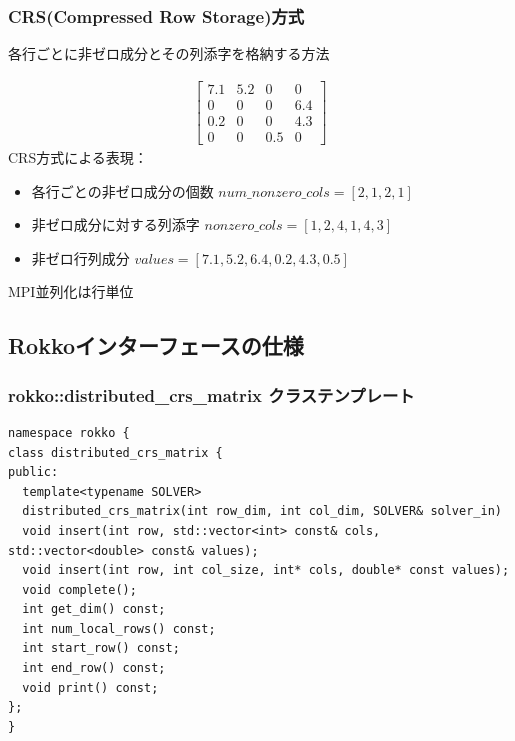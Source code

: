 \begin{frame}[c,fragile]
  \frametitle{CRS(Compressed Row Storage)方式}
各行ごとに非ゼロ成分とその列添字を格納する方法

\begin{rei}%
\vspace{-2\baselineskip}
\begin{align*}
\begin{bmatrix}
7.1 & 5.2 & 0 & 0 \\
0 & 0 & 0 & 6.4 \\
0.2 & 0 & 0 & 4.3 \\
0 & 0 & 0.5 & 0
\end{bmatrix}
\end{align*}
CRS方式による表現：
\begin{itemize}
\item 各行ごとの非ゼロ成分の個数 $num\_nonzero\_cols = [2, 1, 2, 1]$
\item 非ゼロ成分に対する列添字 $nonzero\_cols = [1, 2, 4, 1, 4, 3]$
\item 非ゼロ行列成分 $values = [7.1, 5.2, 6.4, 0.2, 4.3, 0.5]$
\end{itemize}
\end{rei}

MPI並列化は行単位

\end{frame}

\subsection{Rokkoインターフェースの仕様}

\begin{frame}[c,fragile]
  \frametitle{rokko::distributed\_crs\_matrix クラステンプレート}
\begin{lstlisting}
namespace rokko {
class distributed_crs_matrix {
public:
  template<typename SOLVER>
  distributed_crs_matrix(int row_dim, int col_dim, SOLVER& solver_in)
  void insert(int row, std::vector<int> const& cols, std::vector<double> const& values);
  void insert(int row, int col_size, int* cols, double* const values);
  void complete();
  int get_dim() const;
  int num_local_rows() const;
  int start_row() const;
  int end_row() const;
  void print() const;
};
}
\end{lstlisting}
\end{frame}


